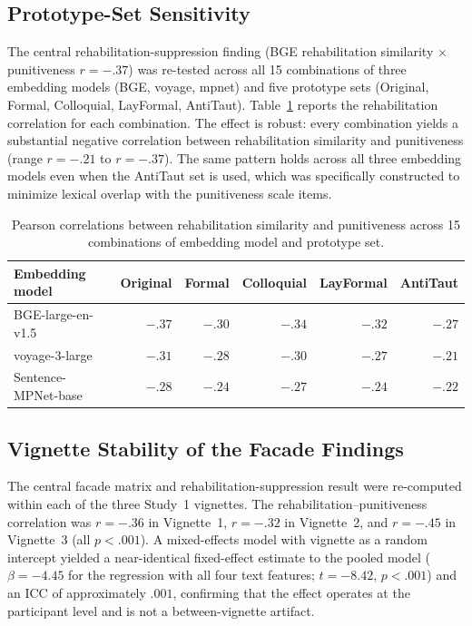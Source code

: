 \subsection{Prototype-Set Sensitivity}

The central rehabilitation-suppression finding (BGE rehabilitation similarity $\times$ punitiveness $r = -.37$) was re-tested across all 15 combinations of three embedding models (BGE, voyage, mpnet) and five prototype sets (Original, Formal, Colloquial, LayFormal, AntiTaut). Table~\ref{tab:supp_protosens} reports the rehabilitation correlation for each combination. The effect is robust: every combination yields a substantial negative correlation between rehabilitation similarity and punitiveness (range $r = -.21$ to $r = -.37$). The same pattern holds across all three embedding models even when the AntiTaut set is used, which was specifically constructed to minimize lexical overlap with the punitiveness scale items.

\begin{table}[htbp]
  \centering
  \caption{Pearson correlations between rehabilitation similarity and punitiveness across 15 combinations of embedding model and prototype set.}
  \label{tab:supp_protosens}
  \small
  \begin{tabular}{lrrrrr}
    \toprule
    Embedding model & Original & Formal & Colloquial & LayFormal & AntiTaut \\
    \midrule
    BGE-large-en-v1.5    & $-.37$ & $-.30$ & $-.34$ & $-.32$ & $-.27$ \\
    voyage-3-large       & $-.31$ & $-.28$ & $-.30$ & $-.27$ & $-.21$ \\
    Sentence-MPNet-base  & $-.28$ & $-.24$ & $-.27$ & $-.24$ & $-.22$ \\
    \bottomrule
  \end{tabular}
\end{table}

\subsection{Vignette Stability of the Facade Findings}

The central facade matrix and rehabilitation-suppression result were re-computed within each of the three Study~1 vignettes. The rehabilitation--punitiveness correlation was $r = -.36$ in Vignette~1, $r = -.32$ in Vignette~2, and $r = -.45$ in Vignette~3 (all $p < .001$). A mixed-effects model with vignette as a random intercept yielded a near-identical fixed-effect estimate to the pooled model ($\beta = -4.45$ for the regression with all four text features; $t = -8.42$, $p < .001$) and an ICC of approximately $.001$, confirming that the effect operates at the participant level and is not a between-vignette artifact.

